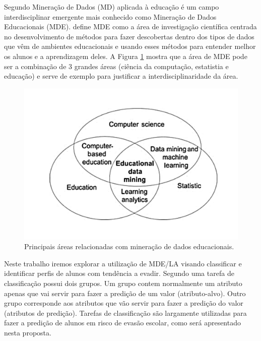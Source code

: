 \documentclass[diss,capa]{texufpel}
\begin{document}
    Segundo \citet{Koedinger2008} Mineração de Dados (MD) aplicada à educação é um campo interdisciplinar emergente mais conhecido como Mineração de Dados Educacionais (MDE).
    \citet{baker2010data} define MDE como a área de investigação científica centrada no desenvolvimento de métodos para fazer descobertas dentro dos tipos de dados que vêm de ambientes educacionais e usando esses métodos para entender melhor os alunos e a aprendizagem deles.
    A Figura \ref{fig:areas-relacionadas-mde} mostra que a área de MDE pode ser a combinação de 3 grandes áreas (ciência da computação, estatistia e educação) e serve de exemplo para justificar a interdisciplinaridade da área.

    \begin{figure}[htbp]
        \centering \includegraphics[scale=.4]{imagens/areas-edm.pdf}
        \caption{Principais áreas relacionadas com mineração de dados educacionais. \cite{Koedinger2008}}
        \label{fig:areas-relacionadas-mde}
    \end{figure}

    Neste trabalho iremos explorar a utilização de MDE/LA visando classificar e identificar perfis de alunos com tendência a evadir.
    Segundo \citet{goldschmidt2015data} uma tarefa de classificação possui dois grupos.
    Um grupo contem normalmente um atributo apenas que vai servir para fazer a predição de um valor (atributo-alvo).
    Outro grupo corresponde aos atributos que vão servir para fazer a predição do valor (atributos de predição).
    Tarefas de classificação são largamente utilizadas para fazer a predição de alunos em risco de evasão escolar, como será apresentado nesta proposta.
\end{document}
